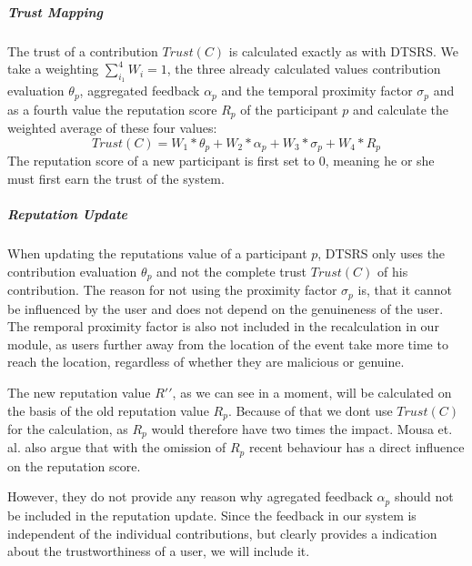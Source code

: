 \documentclass[
a4paper,     %
titlepage,   %
14pt         %
]{scrartcl}  %
\theoremstyle{mystyle}
\begin{document}
\subparagraph{Trust Mapping} The trust of a contribution $Trust(C)$ is calculated exactly as with DTSRS. We take a weighting $\sum_{i_1}^{4} W_i = 1$, the three already calculated values contribution evaluation $\theta_p$, aggregated feedback $\alpha_p$ and the temporal proximity factor $\sigma_p$ and as a fourth value the reputation score $R_p$ of the participant $p$ and calculate the weighted average of these four values:
\begin{equation}
  Trust(C) = W_1 * \theta_p +W_2 *  \alpha_p +W_3 *  \sigma_p +W_4 *  R_p
\end{equation}
The reputation score of a new participant is first set to 0, meaning he or she must first earn the trust of the system.

\subparagraph{Reputation Update} When updating the reputations value of a participant $p$, DTSRS only uses the contribution evaluation $\theta_p$ and not the complete trust $Trust(C)$ of his contribution. The reason for not using the proximity factor $\sigma_p$ is, that it cannot be influenced by the user and does not depend on the genuineness of the user. The remporal proximity factor is also not included in the recalculation in our module, as users further away from the location of the event take more time to reach the location, regardless of whether they are malicious or genuine.

The new reputation value $R\prime\prime$, as we can see in a moment, will be calculated on the basis of the old reputation value $R_p$. Because of that we dont use $Trust(C)$ for the calculation, as $R_p$ would therefore have two times the impact. Mousa et. al. also argue that with the omission of $R_p$ recent behaviour has a direct influence on the reputation score.

However, they do not provide any reason why agregated feedback $\alpha_p$ should not be included in the reputation update. Since the feedback in our system is independent of the individual contributions, but clearly provides a indication about the trustworthiness of a user, we will include it.\\
\end{document}
